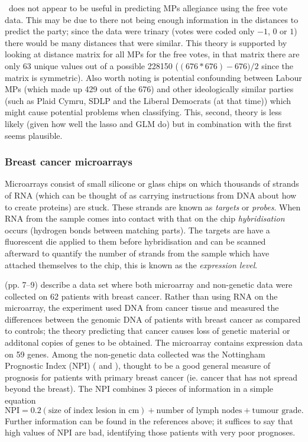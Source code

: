 \mdsds\ does not appear to be useful in predicting MPs allegiance using the free vote data. This may be due to there not being enough information in the distances to predict the party; since the data were trinary (votes were coded only $-1$, $0$ or $1$) there would be many distances that were similar. This theory is supported by looking at distance matrix for all MPs for the free votes, in that matrix there are only 63 unique values out of a possible 228150 ($(676*676)-676)/2$ since the matrix is symmetric). Also worth noting is potential confounding between Labour MPs (which made up 429 out of the 676) and other ideologically similar parties (such as Plaid Cymru, SDLP and the Liberal Democrats (at that time)) which might cause potential problems when classifying. This, second, theory is less likely (given how well the lasso and GLM do) but in combination with the first seems plausible.

\subsubsection{Breast cancer microarrays}

Microarrays consist of small silicone or glass chips on which thousands of strands of RNA (which can be thought of as carrying instructions from DNA about how to create proteins) are stuck. These strands are known as \textit{targets} or \textit{probes}. When RNA from the sample comes into contact with that on the chip \textit{hybridisation} occurs (hydrogen bonds between matching parts). The targets are have a fluorescent die applied to them before hybridisation and can be scanned afterward to quantify the number of strands from the sample which have attached themselves to the chip, this is known as the \textit{expression level}.

\cite{ernstbook} (pp. 7--9) describe a data set where both microarray and non-genetic data were collected on 62 patients with breast cancer. Rather than using RNA on the microarray, the experiment used DNA from cancer tissue and measured the differences between the genomic DNA of patients with breast cancer as compared to controls; the theory predicting that cancer causes loss of genetic material or additonal copies of genes to be obtained. The microarray contains expression data on 59 genes. Among the non-genetic data collected was the Nottingham Prognostic Index (NPI) (\cite{Haybittle1982} and \cite{Todd1987}), thought to be a good general measure of prognosis for patients with primary breast cancer (ie. cancer that has not spread beyond the breast). The NPI combines 3 pieces of information in a simple equation
\begin{equation}
\text{NPI} = 0.2(\text{size of index lesion in cm}) + \text{number of lymph nodes} + \text{tumour grade}.
\end{equation}
Further information can be found in the references above; it suffices to say that high values of NPI are bad, identifying those patients with very poor prognoses.

